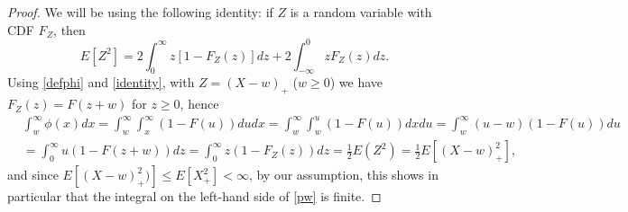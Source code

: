 \documentclass{article}
\numberwithin{equation}{section}
\begin{document}
\begin{proof}
	We will be using the following identity:
	if $Z$ is a random variable with CDF $F_Z$, then 
	\begin{equation}\label{identity}E[Z^2]=2\int_0^\infty z [1-F_Z(z)]dz+2\int_{-\infty}^0 zF_Z(z) dz.\end{equation}
	Using \eqref{defphi} and \eqref{identity}, with $Z=(X-w)_+$ ($w\geq 0$) we have $F_Z(z)=F(z+w)$ for $z\geq 0$, hence
	\begin{align}\label{pw}&\int_w^\infty \phi(x)dx=\int_w^\infty \int_x^\infty (1-F(u))du dx =\int_w^\infty \int_w^u (1-F(u))dx du
		=\int_w^\infty (u-w)(1-F(u)) du \\
		&=\int_0^\infty u(1-F(z+w)) dz=\int_0^\infty z(1-F_Z(z))dz=\frac{1}{2}E(Z^2) =\frac{1}{2}E[(X-w)_+^2], \nonumber
	\end{align}
	and since $E[(X-w)_+^2)]\leq E[X_+^2]<\infty$, by our assumption, this shows in particular that the integral on the left-hand side of \eqref{pw} is finite.
	

\end{proof}
\end{document}

